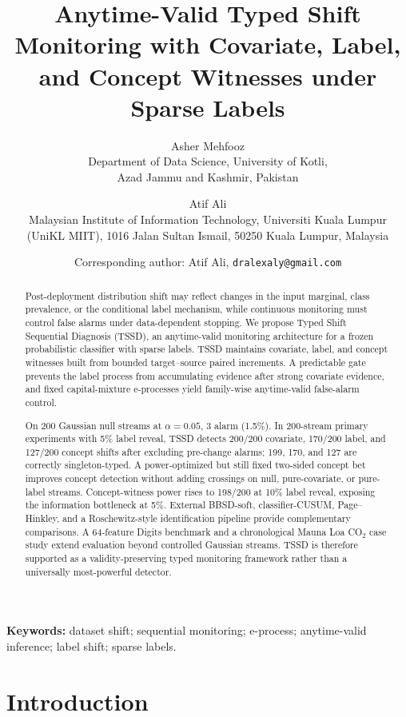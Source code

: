 \documentclass[11pt,a4paper]{article}
\title{\textbf{Anytime-Valid Typed Shift Monitoring with Covariate, Label, and Concept Witnesses under Sparse Labels}}
\author{%
Asher Mehfooz\\[1pt]
{\normalsize Department of Data Science, University of Kotli,}\\[-1pt]
{\normalsize Azad Jammu and Kashmir, Pakistan}
\and
Atif Ali\\[1pt]
{\normalsize Malaysian Institute of Information Technology, Universiti Kuala Lumpur}\\[-1pt]
{\normalsize (UniKL MIIT), 1016 Jalan Sultan Ismail, 50250 Kuala Lumpur, Malaysia}
}
\date{\small Corresponding author: Atif Ali, \texttt{dralexaly@gmail.com}}
\theoremstyle{definition}
\newcommand{\1}{\mathbf{1}}
\begin{document}
\maketitle
\thispagestyle{empty}

\begin{abstract}
\noindent
Post-deployment distribution shift may reflect changes in the input marginal, class prevalence, or the conditional label mechanism, while continuous monitoring must control false alarms under data-dependent stopping. We propose Typed Shift Sequential Diagnosis (TSSD), an anytime-valid monitoring architecture for a frozen probabilistic classifier with sparse labels. TSSD maintains covariate, label, and concept witnesses built from bounded target--source paired increments. A predictable gate prevents the label process from accumulating evidence after strong covariate evidence, and fixed capital-mixture e-processes yield family-wise anytime-valid false-alarm control.

On 200 Gaussian null streams at $\alpha=0.05$, 3 alarm (1.5\%). In 200-stream primary experiments with 5\% label reveal, TSSD detects 200/200 covariate, 170/200 label, and 127/200 concept shifts after excluding pre-change alarms; 199, 170, and 127 are correctly singleton-typed. A power-optimized but still fixed two-sided concept bet improves concept detection without adding crossings on null, pure-covariate, or pure-label streams. Concept-witness power rises to 198/200 at 10\% label reveal, exposing the information bottleneck at 5\%. External BBSD-soft, classifier-CUSUM, Page--Hinkley, and a Roschewitz-style identification pipeline provide complementary comparisons. A 64-feature Digits benchmark and a chronological Mauna Loa CO$_2$ case study extend evaluation beyond controlled Gaussian streams. TSSD is therefore supported as a validity-preserving typed monitoring framework rather than a universally most-powerful detector.
\end{abstract}

\vspace{0.4em}
\noindent\textbf{Keywords:} dataset shift; sequential monitoring; e-process; anytime-valid inference; label shift; sparse labels.

\section{Introduction}
\label{sec:intro}
\end{document}
